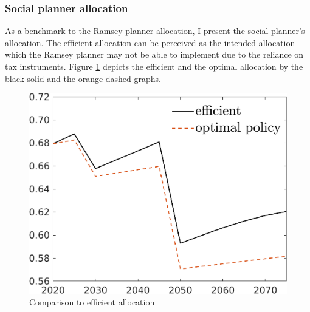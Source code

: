 \subsubsection{Social planner allocation}
As a benchmark to the Ramsey planner allocation, I present the social planner's allocation. The efficient allocation can be perceived as the intended allocation which the Ramsey planner may not be able to implement due to the reliance on tax instruments. Figure \ref{fig:fb_opt} depicts the efficient and the optimal allocation by the black-solid and the orange-dashed graphs. 
\begin{figure}[h!!]
	\centering
	\caption{Comparison to efficient allocation }\label{fig:fb_opt}
	
	\begin{minipage}[]{0.32\textwidth}
		\includegraphics[width=1\textwidth]{../../codding_model/own_basedOnFried/optimalPol_190722_tidiedUp/figures/all_July22/C_CompEffOPT_T_NoTaus_opteff_spillover0_noskill0_sep1_xgrowth0_countec0_etaa0.79_lgd1_lff0.png}
	\end{minipage}
	\begin{minipage}[]{0.32\textwidth}

\end{minipage}
\end{figure}
